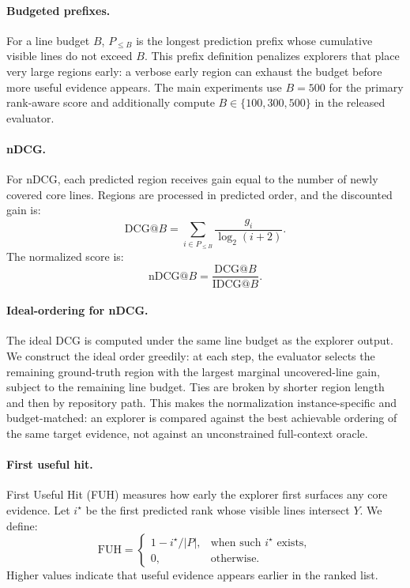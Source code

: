 \documentclass{llmxive}
\begin{document}
\paragraph{Budgeted prefixes.}
For a line budget $B$, $P_{\le B}$ is the longest prediction prefix whose
cumulative visible lines do not exceed $B$. This prefix definition penalizes
explorers that place very large regions early: a verbose early region can
exhaust the budget before more useful evidence appears. The main experiments use
$B=500$ for the primary rank-aware score and additionally compute
$B\in\{100,300,500\}$ in the released evaluator.

\paragraph{nDCG.}
For nDCG, each predicted region receives gain equal to the number of newly
covered core lines. Regions are processed in predicted order, and the discounted
gain is:
\[
\mathrm{DCG}@B
=
\sum_{i\in P_{\le B}}
\frac{g_i}{\log_2(i+2)}.
\]
The normalized score is:
\[
\mathrm{nDCG}@B
=
\frac{\mathrm{DCG}@B}{\mathrm{IDCG}@B}.
\]

\paragraph{Ideal-ordering for nDCG.}
\label{app:idcg}
The ideal DCG is computed under the same line budget as the explorer output. We
construct the ideal order greedily: at each step, the evaluator selects the
remaining ground-truth region with the largest marginal uncovered-line gain,
subject to the remaining line budget. Ties are broken by shorter region length
and then by repository path. This makes the normalization instance-specific and
budget-matched: an explorer is compared against the best achievable ordering of
the same target evidence, not against an unconstrained full-context oracle.

\paragraph{First useful hit.}
First Useful Hit (FUH) measures how early the explorer first surfaces any core
evidence. Let $i^\star$ be the first predicted rank whose visible lines intersect
$Y$. We define:
\[
\mathrm{FUH}
=
\begin{cases}
1 - i^\star/|P|, & \text{when such } i^\star \text{ exists},\\
0, & \text{otherwise}.
\end{cases}
\]
Higher values indicate that useful evidence appears earlier in the ranked list.
\end{document}
